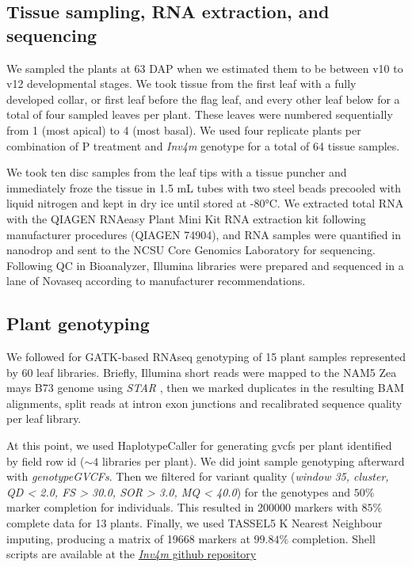 \documentclass[9pt,twocolumn,twoside]{rilabRxiv}
\newcommand{\invfour}{\textit{Inv4m}\xspace}
\begin{document}
\subsection{Tissue sampling, RNA extraction, and sequencing}

We sampled the plants at 63 DAP when we estimated them to be between v10 to v12 developmental stages.
We took tissue from the first leaf with a fully developed collar, or first leaf before the flag leaf, and every other leaf below for a total of four sampled leaves per plant.
These leaves were numbered sequentially from 1 (most apical) to 4 (most basal).
We used four replicate plants per combination of P treatment and \invfour genotype for a total of 64 tissue samples.

We took ten disc samples from the leaf tips with a tissue puncher and immediately froze the tissue in 1.5 mL tubes with two steel beads precooled with liquid nitrogen and kept in dry ice until stored at -80°C.
We extracted total RNA with the QIAGEN RNAeasy Plant Mini Kit RNA extraction kit following manufacturer procedures (QIAGEN 74904), and RNA samples were quantified in nanodrop and sent to the NCSU Core Genomics Laboratory for sequencing.
Following QC in Bioanalyzer, Illumina libraries were prepared and sequenced in a lane of Novaseq according to manufacturer recommendations.

\subsection{Plant genotyping}

We followed \cite{brouard2022} for GATK-based RNAseq genotyping of 15 plant samples represented by 60 leaf libraries.
Briefly, Illumina short reads were mapped to the NAM5 Zea mays B73 genome \cite{hufford2021} using \textit{STAR} \cite{dobin2013}, then we marked duplicates in the resulting BAM alignments, split reads at intron exon junctions and recalibrated sequence quality per leaf library.

At this point, we used HaplotypeCaller for generating gvcfs per plant identified by field row id ($\sim 4$ libraries per plant).
We did joint sample genotyping afterward with \textit{genotypeGVCFs}.
Then we filtered for variant quality (\textit{window 35, cluster, QD < 2.0, FS > 30.0, SOR > 3.0, MQ < 40.0}) for the genotypes and $50\%$ marker completion for individuals.
This resulted in 200000 markers with $85\%$ complete data for 13 plants.
Finally, we used TASSEL5 K Nearest Neighbour imputing, producing a matrix of 19668 markers at $99.84\%$ completion.
Shell scripts are available at the \href{https://github.com/sawers-rellan-labs/inv4m} {\invfour github repository}
\end{document}
